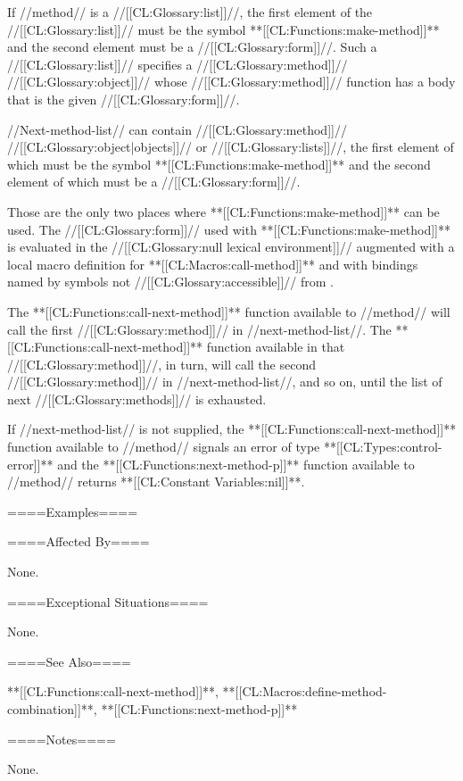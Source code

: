 If //method// is a //[[CL:Glossary:list]]//, the first element of the //[[CL:Glossary:list]]// must be the symbol **[[CL:Functions:make-method]]** and the second element must be a //[[CL:Glossary:form]]//. Such a //[[CL:Glossary:list]]// specifies a //[[CL:Glossary:method]]// //[[CL:Glossary:object]]// whose //[[CL:Glossary:method]]// function has a body that is the given //[[CL:Glossary:form]]//.

//Next-method-list// can contain //[[CL:Glossary:method]]// //[[CL:Glossary:object|objects]]// or //[[CL:Glossary:lists]]//, the first element of which must be the symbol **[[CL:Functions:make-method]]** and the second element of which must be a //[[CL:Glossary:form]]//.



Those are the only two places where **[[CL:Functions:make-method]]** can be used. The //[[CL:Glossary:form]]// used with **[[CL:Functions:make-method]]** is evaluated in the //[[CL:Glossary:null lexical environment]]// augmented with a local macro definition for **[[CL:Macros:call-method]]** and with bindings named by symbols not //[[CL:Glossary:accessible]]// from .

The **[[CL:Functions:call-next-method]]** function available to //method// will call the first //[[CL:Glossary:method]]// in //next-method-list//. The **[[CL:Functions:call-next-method]]** function available in that //[[CL:Glossary:method]]//, in turn, will call the second //[[CL:Glossary:method]]// in //next-method-list//, and so on, until the list of next //[[CL:Glossary:methods]]// is exhausted.



If //next-method-list// is not supplied, the **[[CL:Functions:call-next-method]]** function available to //method// signals an error of type **[[CL:Types:control-error]]** and the **[[CL:Functions:next-method-p]]** function available to //method// returns {**[[CL:Constant Variables:nil]]**}.

====Examples====



====Affected By====

None.

====Exceptional Situations====

None.

====See Also====

**[[CL:Functions:call-next-method]]**, **[[CL:Macros:define-method-combination]]**, **[[CL:Functions:next-method-p]]**

====Notes====

None.


